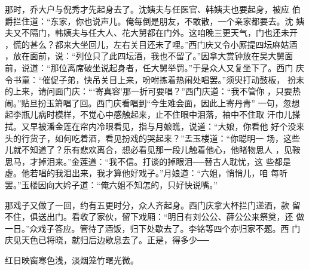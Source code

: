 那时，乔大户与倪秀才先起身去了。沈姨夫与任医官、韩姨夫也要起身，被应
伯爵拦住道：“东家，你也说声儿。俺每倒是朋友，不敢散，一个亲家都要去。沈
姨夫又不隔门，韩姨夫与任大人、花大舅都在门外。这咱晚三更天气，门也还未开
，慌的甚么？都来大坐回儿，左右关目还未了哩。”西门庆又令小厮提四坛麻姑酒
，放在面前，说：“列位只了此四坛酒，我也不留了。”因拿大赏钟放在吴大舅面
前，说道：“那位离席破坐说起身者，任大舅举罚。”于是众人又复坐下了。西门
庆令书童：“催促子弟，快吊关目上来，吩咐拣着热闹处唱罢。”须臾打动鼓板，
扮末的上来，请问面门庆：“‘寄真容’那一折可要唱？”西门庆道：“我不管你
，只要热闹。”贴旦扮玉箫唱了回。西门庆看唱到“今生难会面，因此上寄丹青”
一句，忽想起李瓶儿病时模样，不觉心中感触起来，止不住眼中泪落，袖中不住取
汗巾儿搽拭。又早被潘金莲在帘内冷眼看见，指与月娘瞧，说道：“大娘，你看他
好个没来头的行货子，如何吃着酒，看见扮戏的哭起来？”盂玉楼道：“你聪明一
场，这些儿就不知道了？乐有悲欢离合，想必看见那一段儿触着他心，他睹物思人
，见鞍思马，才掉泪来。”金莲道：“我不信。打谈的掉眼泪──替古人耽忧，这
些都是虚。他若唱的我泪出来，我才算他好戏子。”月娘道：“六姐，悄悄儿，咱
每听罢。”玉楼因向大妗子道：“俺六姐不知怎的，只好快说嘴。”

那戏子又做了一回，约有五更时分，众人齐起身。西门庆拿大杯拦门递酒，款
留不住，俱送出门。看收了家伙，留下戏厢：“明日有刘公公、薛公公来祭奠，还
做一日。”众戏子答应。管待了酒饭，归下处歇去了。李铭等四个亦归家不题。西
门庆见天色已将晓，就归后边歇息去了。正是，得多少──

红日映窗寒色浅，淡烟笼竹曙光微。